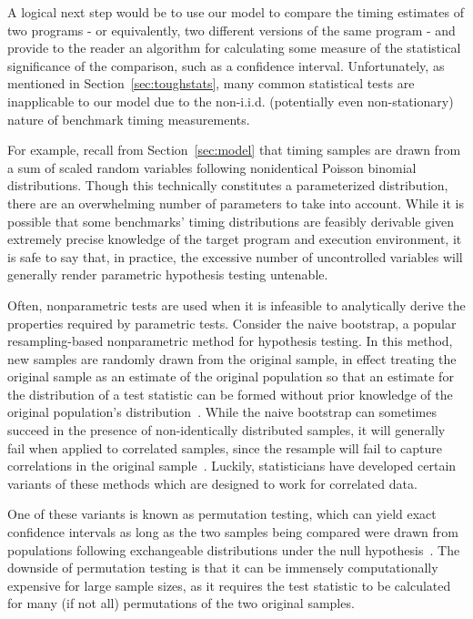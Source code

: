 \documentclass[conference]{IEEEtran}
\begin{document}
A logical next step would be to use our model to compare the timing estimates of two
programs - or equivalently, two different versions of the same program - and provide to the
reader an algorithm for calculating some measure of the statistical significance of the
comparison, such as a confidence interval. Unfortunately, as mentioned in
Section~\ref{sec:toughstats}, many common statistical tests are inapplicable to our
model due to the non-i.i.d. (potentially even non-stationary) nature of benchmark timing
measurements.

For example, recall from Section~\ref{sec:model} that timing samples are drawn from a sum of
scaled random variables following nonidentical Poisson binomial distributions. Though this
technically constitutes a parameterized distribution, there are an overwhelming number of
parameters to take into account. While it is possible that some benchmarks' timing
distributions are feasibly derivable given extremely precise knowledge of the target program
and execution environment, it is safe to say that, in practice, the excessive number of
uncontrolled variables will generally render parametric hypothesis testing untenable.

Often, nonparametric tests are used when it is infeasible to analytically derive the
properties required by parametric tests. Consider the naive bootstrap, a popular
resampling-based nonparametric method for hypothesis testing. In this method, new samples
are randomly drawn from the original sample, in effect treating the original sample as an
estimate of the original population so that an estimate for the distribution of a test
statistic can be formed without prior knowledge of the original population's
distribution~\cite{Efron1992}. While the naive bootstrap can sometimes succeed in the
presence of non-identically distributed samples, it will generally fail when applied to
correlated samples, since the resample will fail to capture correlations in the original
sample~\cite{Mammen2012}. Luckily, statisticians have developed certain variants of these
methods which are designed to work for correlated data.

One of these variants is known as permutation testing, which can yield exact confidence
intervals as long as the two samples being compared were drawn from populations following
exchangeable distributions under the null hypothesis~\cite{Good2013}. The downside of
permutation testing is that it can be immensely computationally expensive for large sample
sizes, as it requires the test statistic to be calculated for many (if not all) permutations
of the two original samples.
\end{document}
